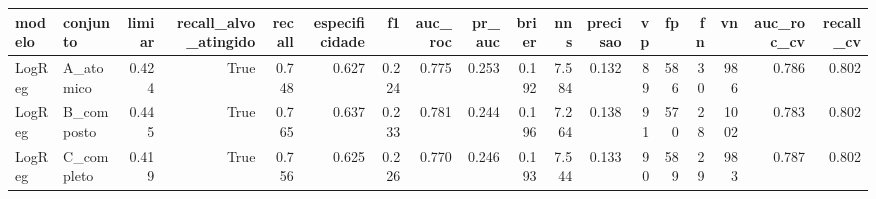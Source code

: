 \begin{tabular}{llrrrrrrrrrrrrrrrr}
\toprule
modelo & conjunto & limiar & recall_alvo_atingido & recall & especificidade & f1 & auc_roc & pr_auc & brier & nns & precisao & vp & fp & fn & vn & auc_roc_cv & recall_cv \\
\midrule
LogReg & A_atomico & 0.424 & True & 0.748 & 0.627 & 0.224 & 0.775 & 0.253 & 0.192 & 7.584 & 0.132 & 89 & 586 & 30 & 986 & 0.786 & 0.802 \\
LogReg & B_composto & 0.445 & True & 0.765 & 0.637 & 0.233 & 0.781 & 0.244 & 0.196 & 7.264 & 0.138 & 91 & 570 & 28 & 1002 & 0.783 & 0.802 \\
LogReg & C_completo & 0.419 & True & 0.756 & 0.625 & 0.226 & 0.770 & 0.246 & 0.193 & 7.544 & 0.133 & 90 & 589 & 29 & 983 & 0.787 & 0.802 \\
\bottomrule
\end{tabular}
